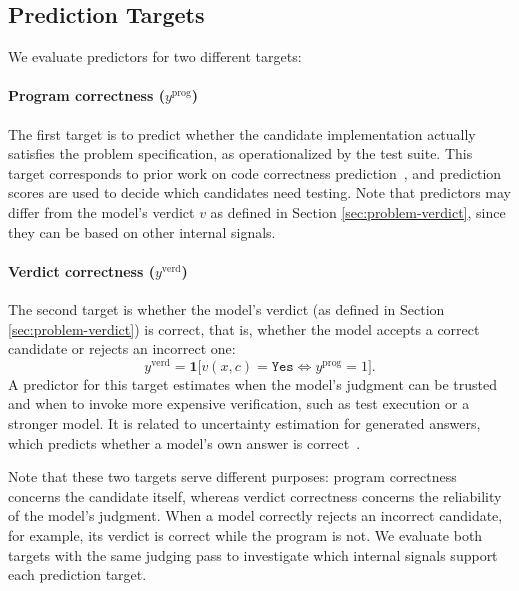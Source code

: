 \subsection{Prediction Targets}
We evaluate predictors for two different targets: %

\paragraph{Program correctness ($y^{\mathrm{prog}}$)}
The first target is to predict whether the candidate implementation actually satisfies the problem specification, as operationalized by the test suite. This target corresponds to prior work on code correctness
prediction~\cite{bui2025openia, ribeiro2026repe, valentin2026incoherence,
sharma2025, he2026usingsemanticdistanceestimate}, and 
prediction scores are used to decide which candidates need testing.
Note that predictors may differ from the model's verdict $v$ as defined in Section \ref{sec:problem-verdict}, since they can be based on other internal signals. 

\paragraph{Verdict correctness ($y^{\mathrm{verd}}$)}
The second target is whether the model's verdict (as defined in Section \ref{sec:problem-verdict}) is correct, that is, whether
the model accepts a correct candidate or rejects an incorrect one:
\begin{equation*}
y^{\mathrm{verd}} = \mathbf{1}\bigl[v(x, c) = \texttt{Yes} \Leftrightarrow
y^{\mathrm{prog}} = 1\bigr].
\end{equation*}
A predictor for this target estimates when the model's judgment can be
trusted and when to invoke more expensive verification, such as test
execution or a stronger model. It is related to uncertainty estimation for generated answers, which predicts whether a model's own answer is
correct~\cite{Kadavath2022LanguageM, Huang2025Internal}.

Note that these two targets serve different purposes: program correctness concerns the
candidate itself, whereas verdict correctness concerns the reliability of the model's
judgment. When a model correctly rejects an incorrect candidate, for example,
its verdict is correct while the program is not. We evaluate both targets with the
same judging pass to investigate which internal signals support each prediction target.

